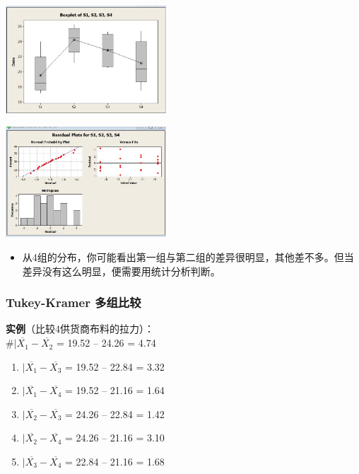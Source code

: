 
\includegraphics[width=6cm]{AnovaBoxplots807.jpg}


\includegraphics[width=6cm]{Anova3inOneScreenshot_2022-08-07_125131.jpg}

\begin{itemize}
\tightlist
\item
  从4组的分布，你可能看出第一组与第二组的差异很明显，其他差不多。但当差异没有这么明显，便需要用统计分析判断。
\end{itemize}

\hypertarget{tukey-kramer-ux591aux7ec4ux6bd4ux8f83}{%
\subsubsection{Tukey-Kramer
多组比较}\label{tukey-kramer-ux591aux7ec4ux6bd4ux8f83}}

\textbf{实例}（比较4供货商布料的拉力）：\\
\#\(|\overline{X_1} - \overline{X_2}\) = \textbar{}19.52 --
24.26\textbar{} = 4.74

\begin{enumerate}
\tightlist
\item
  \(|\overline{X_1} - \overline{X_3}\) = \textbar{}19.52 --
  22.84\textbar{} = 3.32
\item
  \(|\overline{X_1} - \overline{X_4}\) = \textbar{}19.52 --
  21.16\textbar{} = 1.64
\item
  \(|\overline{X_2} - \overline{X_3}\) = \textbar{}24.26 --
  22.84\textbar{} = 1.42
\item
  \(|\overline{X_2} - \overline{X_4}\) = \textbar{}24.26 --
  21.16\textbar{} = 3.10
\item
  \(|\overline{X_3} - \overline{X_4}\) = \textbar{}22.84 --
  21.16\textbar{} = 1.68
\end{enumerate}

